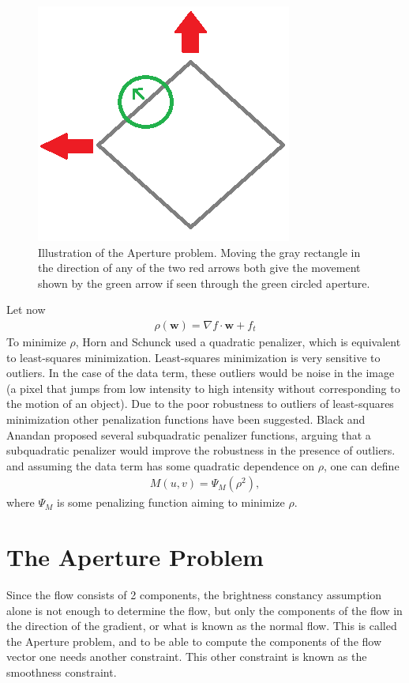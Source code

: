 \begin{figure}
    \centering
    \includegraphics[scale=0.5]{Figures/ApertureProblem.png}
    \caption{Illustration of the Aperture problem. Moving the gray rectangle in the direction of any of the two red arrows both give the movement shown by the green arrow if seen through the green circled aperture.}
    \label{ApertureProblem}
\end{figure}



Let now
\begin{align*}
\rho(\textbf{w}) = \nabla f \cdot \textbf{w} + f_t
\end{align*}
To minimize $\rho$, Horn and Schunck used a quadratic penalizer, which is equivalent to least-squares minimization. Least-squares minimization is very sensitive to outliers. In the case of the data term, these outliers would be noise in the image (a pixel that jumps from low intensity to high intensity without corresponding to the motion of an object). Due to the poor robustness to outliers of least-squares minimization other penalization functions have been suggested. Black and Anandan \cite{Black199675} proposed several subquadratic penalizer functions, arguing that a subquadratic penalizer would improve the robustness in the presence of outliers.
and assuming the data term has some quadratic dependence on $\rho$, one can define
\begin{align}
\label{DataPenalize}
M(u,v) = \Psi_M(\rho^2),
\end{align}
where $\Psi_M$ is some penalizing function aiming to minimize $\rho$. 
\section{The Aperture Problem}
Since the flow consists of 2 components, the brightness constancy assumption alone is not enough to determine the flow, but only the components of the flow in the direction of the gradient, or what is known as the normal flow. This is called the Aperture problem, and to be able to compute the components of the flow vector one needs another constraint. This other constraint is known as the smoothness constraint.